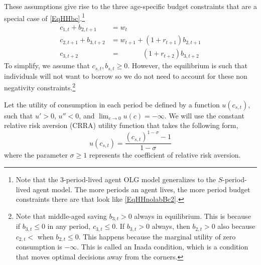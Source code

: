 \documentclass[letterpaper,12pt]{article}
\theoremstyle{definition}
\numberwithin{equation}{section}
\numberwithin{exercise}{section}
\begin{document}
\begin{spacing}{1.5}
      These assumptions give rise to the three age-specific budget constraints that are a special case of \eqref{EqHHbc}.\footnote{Note that the 3-period-lived agent OLG model generalizes to the $S$-period-lived agent model. The more periods an agent lives, the more period budget constraints there are that look like \eqref{EqHHnolabBc2}.}
      \begin{align}
         c_{1,t} + b_{2,t+1} &= w_t \label{EqHHnolabBc1} \\
         c_{2,t+1} + b_{3,t+2} &= w_{t+1} + (1 + r_{t+1})b_{2,t+1} \label{EqHHnolabBc2} \\
         c_{3,t+2}\:\:\:\quad\quad\quad &= \quad\quad\quad\,(1 + r_{t+2})b_{3,t+2} \label{EqHHnolabBc3}
      \end{align}
      To simplify, we assume that $c_{s,t},b_{s,t}\geq 0$. However, the equilibrium is such that individuals will not want to borrow so we do not need to account for these non negativity constraints.\footnote{Note that middle-aged saving $b_{3,t}>0$ always in equilibrium. This is because if $b_{3,t}\leq 0$ in any period, $c_{3,t}\leq 0$. If $b_{3,t}>0$ always, then $b_{2,t}>0$ also because $c_{2,t}<$ when $b_{2,t}\leq 0$. This happens because the marginal utility of zero consumption is $-\infty$. This is called an Inada condition, which is a condition that moves optimal decisions away from the corners.}

      Let the utility of consumption in each period be defined by a function $u(c_{s,t})$, such that $u'>0$, $u''<0$, and $\lim_{c\rightarrow 0}u(c) = -\infty$. We will use the constant relative risk aversion (CRRA) utility function that takes the following form,
      \begin{equation}\label{EqHHutil}
         u(c_{s,t}) = \frac{(c_{s,t})^{1-\sigma}- 1}{1-\sigma}
      \end{equation}
      where the parameter $\sigma\geq 1$ represents the coefficient of relative risk aversion.


\end{spacing}
\end{document}

